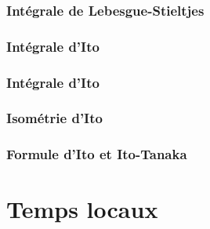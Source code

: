 \documentclass[openany]{book}
\theoremstyle{thmfont}
\theoremstyle{deffont}
\theoremstyle{thmfont}
\theoremstyle{deffont}
\begin{document}
\subsection{Intégrale de Lebesgue-Stieltjes}
\subsection{Intégrale d'Ito}
\subsection{Intégrale d'Ito}
\subsection{Isométrie d'Ito}
\subsection{Formule d'Ito et Ito-Tanaka}

\chapter{Temps locaux}
\end{document}
